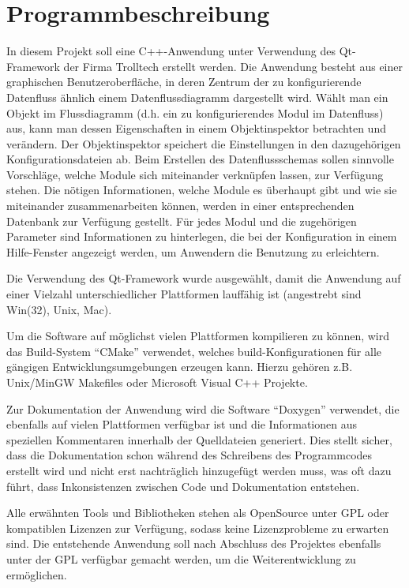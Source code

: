 \documentclass[a4paper, 11pt, fleqn, pointlessnumbers]{scrartcl}
\begin{document}
  \section{Programmbeschreibung}
  In diesem Projekt soll eine C++-Anwendung unter Verwendung des
  Qt-Framework der Firma Trolltech erstellt werden. Die Anwendung
  besteht aus einer graphischen Benutzeroberfläche, in deren Zentrum
  der zu konfigurierende Datenfluss ähnlich einem Datenflussdiagramm
  dargestellt wird. Wählt man ein Objekt im Flussdiagramm (d.h. ein zu
  konfigurierendes Modul im Datenfluss) aus, kann man dessen Eigenschaften in
  einem Objektinspektor betrachten und verändern. Der Objektinspektor
  speichert die Einstellungen in den dazugehörigen Konfigurationsdateien ab.
  Beim Erstellen des Datenflussschemas sollen sinnvolle Vorschläge, welche
  Module sich miteinander verknüpfen lassen, zur Verfügung stehen. Die nötigen
  Informationen, welche Module es überhaupt gibt und wie sie miteinander
  zusammenarbeiten können, werden in einer entsprechenden Datenbank zur
  Verfügung gestellt. Für jedes Modul und die zugehörigen Parameter
  sind Informationen zu hinterlegen, die bei der Konfiguration in einem
  Hilfe-Fenster angezeigt werden, um Anwendern die Benutzung zu
  erleichtern.

  Die Verwendung des Qt-Framework wurde ausgewählt, damit die
  Anwendung auf einer Vielzahl unterschiedlicher Plattformen lauffähig ist
  (angestrebt sind Win(32), Unix, Mac).

  Um die Software auf möglichst vielen Plattformen kompilieren zu können,
  wird das Build-System "`CMake"' verwendet, welches build-Konfigurationen
  für alle gängigen Entwicklungsumgebungen erzeugen kann. Hierzu gehören z.B.
  Unix/MinGW Makefiles oder Microsoft Visual C++ Projekte.

  Zur Dokumentation der Anwendung wird die Software "`Doxygen"' verwendet,
  die ebenfalls auf vielen Plattformen verfügbar ist und die Informationen
  aus speziellen Kommentaren innerhalb der Quelldateien generiert. Dies stellt
  sicher, dass die Dokumentation schon während des Schreibens des
  Programmcodes erstellt wird und nicht erst nachträglich hinzugefügt werden
  muss, was oft dazu führt, dass Inkonsistenzen zwischen Code und
  Dokumentation entstehen.

  Alle erwähnten Tools und Bibliotheken stehen als OpenSource unter GPL oder
  kompatiblen Lizenzen zur Verfügung, sodass keine Lizenzprobleme zu erwarten
  sind. Die entstehende Anwendung soll nach Abschluss des Projektes ebenfalls
  unter der GPL verfügbar gemacht werden, um die Weiterentwicklung zu ermöglichen.
\end{document}
